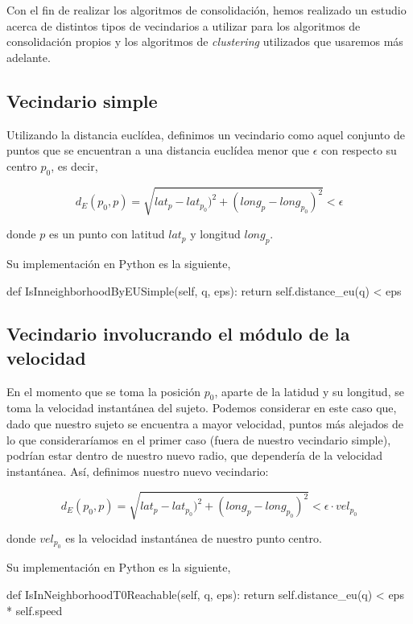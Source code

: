 \documentclass[a4paper, 12pt]{article}
\begin{document}
Con el fin de realizar los algoritmos de consolidaci\'on, hemos realizado un estudio acerca de distintos tipos de vecindarios a utilizar para los algoritmos de consolidaci\'on propios y los algoritmos de \textit{clustering} utilizados que usaremos m\'as adelante.

\subsection{Vecindario simple}

Utilizando la distancia eucl\'idea, definimos un vecindario como aquel conjunto de puntos que se  encuentran a una distancia eucl\'idea menor que $\epsilon$ con respecto su centro $p_0$, es decir,

$$ d_E(p_0, p) = \sqrt{lat_{p} - lat_{p_0})^2 + (long_{p} - long_{p_0})^2 } < \epsilon $$

donde $p$ es un punto con latitud $lat_{p}$ y longitud $long_{p}$.

Su implementaci\'on en Python es la siguiente,

\begin{python}
        def IsInneighborhoodByEUSimple(self, q, eps):
                return self.distance_eu(q) < eps
\end{python}


\subsection{Vecindario involucrando el m\'odulo de la velocidad}

En el momento que se toma la posici\'on $p_0$, aparte de la latidud y su longitud, se toma la velocidad instant\'anea del sujeto. Podemos considerar en este caso que, dado que nuestro sujeto se  encuentra a mayor velocidad, puntos m\'as alejados de lo que considerar\'iamos en el primer caso (fuera de nuestro vecindario simple), podr\'ian estar dentro de nuestro nuevo radio, que depender\'ia de la velocidad instant\'anea. As\'i, definimos nuestro nuevo vecindario:

$$ d_E(p_0, p) = \sqrt{lat_{p} - lat_{p_0})^2 + (long_{p} - long_{p_0})^2 } < \epsilon \cdot vel_{p_0} $$

donde $vel_{p_0}$ es la velocidad instant\'anea de nuestro punto centro.


Su implementaci\'on en Python es la siguiente,

\begin{python}
        def IsInNeighborhoodT0Reachable(self, q, eps):
                return self.distance_eu(q) < eps * self.speed
\end{python}
\end{document}
